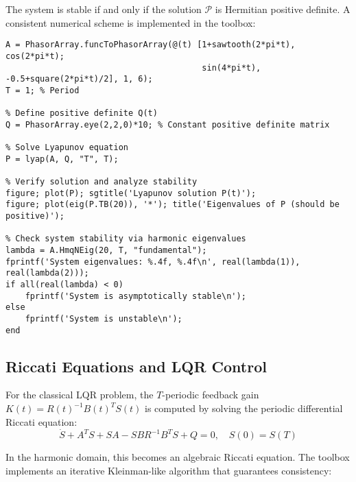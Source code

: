 \documentclass[11pt,a4paper]{article}
\begin{document}
The system is stable if and only if the solution $\mathcal{P}$ is Hermitian positive definite. A consistent numerical scheme is implemented in the toolbox:

\begin{lstlisting}[style=matlabstyle]
% Create periodic system matrix
A = PhasorArray.funcToPhasorArray(@(t) [1+sawtooth(2*pi*t), cos(2*pi*t); 
                                        sin(4*pi*t), -0.5+square(2*pi*t)/2], 1, 6);
T = 1; % Period

% Define positive definite Q(t)
Q = PhasorArray.eye(2,2,0)*10; % Constant positive definite matrix

% Solve Lyapunov equation
P = lyap(A, Q, "T", T);

% Verify solution and analyze stability
figure; plot(P); sgtitle('Lyapunov solution P(t)');
figure; plot(eig(P.TB(20)), '*'); title('Eigenvalues of P (should be positive)');

% Check system stability via harmonic eigenvalues
lambda = A.HmqNEig(20, T, "fundamental");
fprintf('System eigenvalues: %.4f, %.4f\n', real(lambda(1)), real(lambda(2)));
if all(real(lambda) < 0)
    fprintf('System is asymptotically stable\n');
else
    fprintf('System is unstable\n');
end
\end{lstlisting}

\subsection{Riccati Equations and LQR Control}

For the classical LQR problem, the $T$-periodic feedback gain $K(t) = R(t)^{-1}B(t)^T S(t)$ is computed by solving the periodic differential Riccati equation:
\begin{equation}
\dot{S} + A^T S + S A - S B R^{-1} B^T S + Q = 0, \quad S(0) = S(T)
\end{equation}

In the harmonic domain, this becomes an algebraic Riccati equation. The toolbox implements an iterative Kleinman-like algorithm that guarantees consistency:
\end{document}
